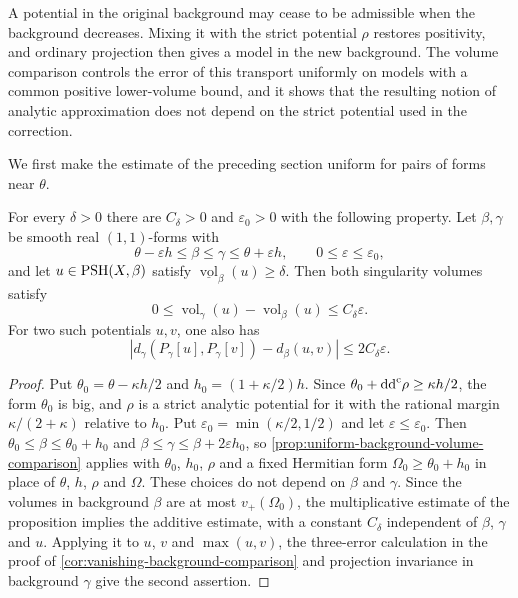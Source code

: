 A potential in the original background may cease to be admissible when the background decreases. Mixing it with the strict potential $\rho$ restores positivity, and ordinary projection then gives a model in the new background. The volume comparison controls the error of this transport uniformly on models with a common positive lower-volume bound, and it shows that the resulting notion of analytic approximation does not depend on the strict potential used in the correction.

We first make the estimate of the preceding section uniform for pairs of forms near $\theta$.

\begin{lemma}\label{lem:nearby-background-volume-comparison}
For every $\delta>0$ there are $C_\delta>0$ and $\varepsilon_0>0$ with the following property. Let $\beta,\gamma$ be smooth real $(1,1)$-forms with
\[
 \theta-\varepsilon h\leq\beta\leq\gamma\leq\theta+\varepsilon h,
 \qquad 0\leq\varepsilon\leq\varepsilon_0,
\]
and let $u\in\mathrm{PSH}(X,\beta)$ satisfy $\underline{\operatorname{vol}}_\beta(u)\geq\delta$. Then both singularity volumes satisfy
\[
 0\leq\operatorname{vol}_\gamma(u)-\operatorname{vol}_\beta(u)
       \leq C_\delta\varepsilon.
\]
For two such potentials $u,v$, one also has
\[
 \left|d_\gamma(P_\gamma[u],P_\gamma[v])-d_\beta(u,v)\right|
       \leq2C_\delta\varepsilon.
\]
\end{lemma}
\begin{proof}
Put $\theta_0=\theta-\kappa h/2$ and $h_0=(1+\kappa/2)h$. Since $\theta_0+\mathrm{dd}^{\mathrm{c}}\rho\geq\kappa h/2$, the form $\theta_0$ is big, and $\rho$ is a strict analytic potential for it with the rational margin $\kappa/(2+\kappa)$ relative to $h_0$. Put $\varepsilon_0=\min(\kappa/2,1/2)$ and let $\varepsilon\leq\varepsilon_0$. Then $\theta_0\leq\beta\leq\theta_0+h_0$ and $\beta\leq\gamma\leq\beta+2\varepsilon h_0$, so \cref{prop:uniform-background-volume-comparison} applies with $\theta_0$, $h_0$, $\rho$ and a fixed Hermitian form $\Omega_0\geq\theta_0+h_0$ in place of $\theta$, $h$, $\rho$ and $\Omega$. These choices do not depend on $\beta$ and $\gamma$. Since the volumes in background $\beta$ are at most $v_+(\Omega_0)$, the multiplicative estimate of the proposition implies the additive estimate, with a constant $C_\delta$ independent of $\beta$, $\gamma$ and $u$. Applying it to $u$, $v$ and $\max(u,v)$, the three-error calculation in the proof of \cref{cor:vanishing-background-comparison} and projection invariance in background $\gamma$ give the second assertion.
\end{proof}

